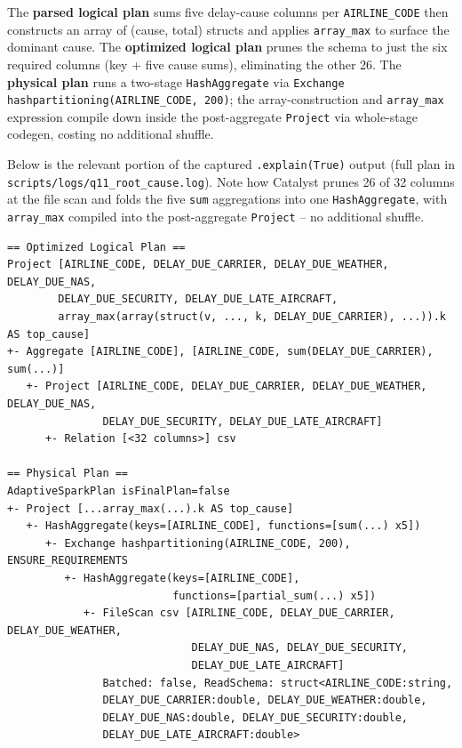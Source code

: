 \documentclass{article}
\begin{document}
The \textbf{parsed logical plan} sums five delay-cause columns per \texttt{AIRLINE\_CODE} then constructs an array of (cause, total) structs and applies \texttt{array\_max} to surface the dominant cause. The \textbf{optimized logical plan} prunes the schema to just the six required columns (key + five cause sums), eliminating the other 26. The \textbf{physical plan} runs a two-stage \texttt{HashAggregate} via \texttt{Exchange hashpartitioning(AIRLINE\_CODE, 200)}; the array-construction and \texttt{array\_max} expression compile down inside the post-aggregate \texttt{Project} via whole-stage codegen, costing no additional shuffle.

Below is the relevant portion of the captured \texttt{.explain(True)} output (full plan in \texttt{scripts/logs/q11\_root\_cause.log}). Note how Catalyst prunes 26 of 32 columns at the file scan and folds the five \texttt{sum} aggregations into one \texttt{HashAggregate}, with \texttt{array\_max} compiled into the post-aggregate \texttt{Project} -- no additional shuffle.

\begin{footnotesize}
\begin{verbatim}
== Optimized Logical Plan ==
Project [AIRLINE_CODE, DELAY_DUE_CARRIER, DELAY_DUE_WEATHER, DELAY_DUE_NAS,
        DELAY_DUE_SECURITY, DELAY_DUE_LATE_AIRCRAFT,
        array_max(array(struct(v, ..., k, DELAY_DUE_CARRIER), ...)).k AS top_cause]
+- Aggregate [AIRLINE_CODE], [AIRLINE_CODE, sum(DELAY_DUE_CARRIER), sum(...)]
   +- Project [AIRLINE_CODE, DELAY_DUE_CARRIER, DELAY_DUE_WEATHER, DELAY_DUE_NAS,
               DELAY_DUE_SECURITY, DELAY_DUE_LATE_AIRCRAFT]
      +- Relation [<32 columns>] csv

== Physical Plan ==
AdaptiveSparkPlan isFinalPlan=false
+- Project [...array_max(...).k AS top_cause]
   +- HashAggregate(keys=[AIRLINE_CODE], functions=[sum(...) x5])
      +- Exchange hashpartitioning(AIRLINE_CODE, 200), ENSURE_REQUIREMENTS
         +- HashAggregate(keys=[AIRLINE_CODE],
                          functions=[partial_sum(...) x5])
            +- FileScan csv [AIRLINE_CODE, DELAY_DUE_CARRIER, DELAY_DUE_WEATHER,
                             DELAY_DUE_NAS, DELAY_DUE_SECURITY,
                             DELAY_DUE_LATE_AIRCRAFT]
               Batched: false, ReadSchema: struct<AIRLINE_CODE:string,
               DELAY_DUE_CARRIER:double, DELAY_DUE_WEATHER:double,
               DELAY_DUE_NAS:double, DELAY_DUE_SECURITY:double,
               DELAY_DUE_LATE_AIRCRAFT:double>
\end{verbatim}
\end{footnotesize}
\end{document}
